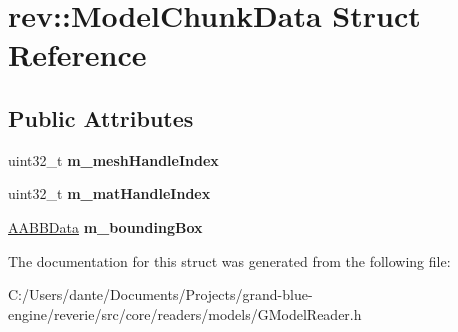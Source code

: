 \hypertarget{structrev_1_1_model_chunk_data}{}\section{rev\+::Model\+Chunk\+Data Struct Reference}
\label{structrev_1_1_model_chunk_data}
\subsection*{Public Attributes}
\begin{DoxyCompactItemize}
\item 
\mbox{\label{structrev_1_1_model_chunk_data_ad410513d73b6a2d0c97687dc226e904f}} 
uint32\+\_\+t {\bfseries m\+\_\+mesh\+Handle\+Index}
\item 
\mbox{\label{structrev_1_1_model_chunk_data_aaa8ce0a46e4724d83ec9037945dd5f23}} 
uint32\+\_\+t {\bfseries m\+\_\+mat\+Handle\+Index}
\item 
\mbox{\label{structrev_1_1_model_chunk_data_a9da84ecd13e7c4fd6b937460fd84f6cc}} 
\mbox{\hyperlink{structrev_1_1_a_a_b_b_data}{A\+A\+B\+B\+Data}} {\bfseries m\+\_\+bounding\+Box}
\end{DoxyCompactItemize}


The documentation for this struct was generated from the following file\+:\begin{DoxyCompactItemize}
\item 
C\+:/\+Users/dante/\+Documents/\+Projects/grand-\/blue-\/engine/reverie/src/core/readers/models/G\+Model\+Reader.\+h\end{DoxyCompactItemize}
